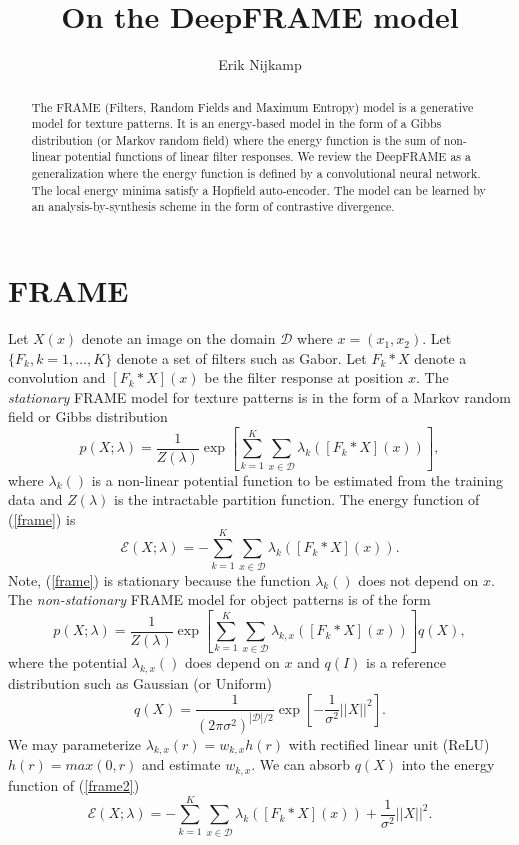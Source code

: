 \documentclass[11pt]{article}
\def\D{\mathcal{D}}
\def\En{\mathcal{E}}
\def\I{X}
\begin{document}
	
\title{On the DeepFRAME model}
\author{Erik Nijkamp}
\date{}
\maketitle

\begin{abstract}
The FRAME (Filters, Random Fields and Maximum Entropy) model \citep{ZhuWM97} is a generative model for texture patterns. It is an energy-based model in the form of a Gibbs distribution (or Markov random field) where the energy function is the sum of non-linear potential functions of linear filter responses. We review the DeepFRAME \citep{xie} as a generalization where the energy function is defined by a convolutional neural network. The local energy minima satisfy a Hopfield auto-encoder. The model can be learned by an analysis-by-synthesis scheme in the form of contrastive divergence.
\end{abstract}

\section{FRAME}
Let $\I(x)$ denote an image on the domain $\D$ where $x=(x_1,x_2)$. Let $\{F_k,k=1,\ldots,K\}$ denote a set of filters such as Gabor. Let $F_k*\I$ denote a convolution and $[F_k*\I](x)$ be the filter response at position $x$.
The \textit{stationary} FRAME model for texture patterns is in the form of a Markov random field or Gibbs distribution
\begin{equation}
p(\I;\lambda)=\frac{1}{Z(\lambda)}\exp\left[ \sum_{k=1}^K \sum_{x\in\D}\lambda_k([F_k*\I](x)) \right],\label{frame}
\end{equation}
where $\lambda_k()$ is a non-linear potential function to be estimated from the training data and $Z(\lambda)$ is the intractable partition function. The energy function of (\ref{frame}) is 
\begin{equation}
\En(\I;\lambda)=-\sum_{k=1}^K \sum_{x\in\D}\lambda_k([F_k*\I](x)).
\end{equation}
Note, (\ref{frame}) is stationary because the function $\lambda_k()$ does not depend on $x$.
The \textit{non-stationary} FRAME model for object patterns is of the form
\begin{equation}
p(\I;\lambda)=\frac{1}{Z(\lambda)}\exp\left[ \sum_{k=1}^K \sum_{x\in\D}\lambda_{k,x}([F_k*\I](x)) \right]q(\I),\label{frame2}
\end{equation}
where the potential $\lambda_{k,x}()$ does depend on $x$ and $q(I)$ is a reference distribution such as Gaussian (or Uniform)
\begin{equation}
q(\I)=\frac{1}{(2\pi\sigma^2)^{|\D|/2}}\exp\left[ -\frac{1}{\sigma^2} || \I ||^2 \right].\label{prior}
\end{equation}
We may parameterize $\lambda_{k,x}(r)=w_{k,x}h(r)$ with rectified linear unit (ReLU) $h(r) = max(0,r)$ and estimate $w_{k,x}$. We can absorb $q(\I)$ into the energy function of (\ref{frame2})
\begin{equation}
\En(\I;\lambda)=-\sum_{k=1}^K \sum_{x\in\D}\lambda_k([F_k*\I](x))+\frac{1}{\sigma^2} || \I ||^2.
\end{equation}
\end{document}

